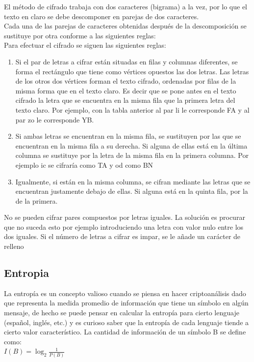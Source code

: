 \documentclass[10pt]{article}
\begin{document}
El método de cifrado trabaja con dos caracteres
(bigrama) a la vez, por lo que el texto en claro se
debe descomponer en parejas de dos caracteres.\\
Cada una de las parejas de caracteres obtenidas
después de la descomposición se sustituye por otra
conforme a las siguientes reglas:\\
Para efectuar el cifrado se siguen las siguientes
reglas:
\begin{enumerate}
  \item Si el par de letras a cifrar están situadas en
  filas y columnas diferentes, se forma el
  rectángulo que tiene como vértices
  opuestos las dos letras. Las letras de los
  otros dos vértices forman el texto cifrado,
  ordenadas por filas de la misma forma que
  en el texto claro. Es decir que se pone
  antes en el texto cifrado la letra que se
  encuentra en la misma fila que la primera
  letra del texto claro. Por ejemplo, con la
  tabla anterior al par li le corresponde FA y
  al par zo le corresponde YB.
  \item Si ambas letras se encuentran en la misma
  fila, se sustituyen por las que se 
  encuentran en la misma fila a su derecha.
  Si alguna de ellas está en la última
  columna se sustituye por la letra de la
  misma fila en la primera columna. Por
  ejemplo ic se cifraría como TA y od como
  BN
  \item Igualmente, si están en la misma columna,
  se cifran mediante las letras que se
  encuentran justamente debajo de ellas. Si
  alguna está en la quinta fila, por la de la
  primera.  
\end{enumerate}

No se pueden cifrar pares compuestos por
letras iguales. La solución es procurar que no
suceda esto por ejemplo introduciendo una
letra con valor nulo entre los dos iguales. Si el
número de letras a cifrar es impar, se le añade
un carácter de relleno

\subsection{Entropia}
\justify
La entropía es un concepto valioso cuando se piensa en hacer 
criptoanálisis dado que representa la medida promedio de 
información que tiene un símbolo en algún mensaje, de hecho se 
puede pensar en calcular la entropía para cierto lenguaje 
(español, inglés, etc.) y es curioso saber que la entropía de cada 
lenguaje tiende a cierto valor característico.
La cantidad de información de un símbolo B se define como:\\
$I(B)=\log_2{\frac{1}{P(B)}}$
\newpage
\end{document}
